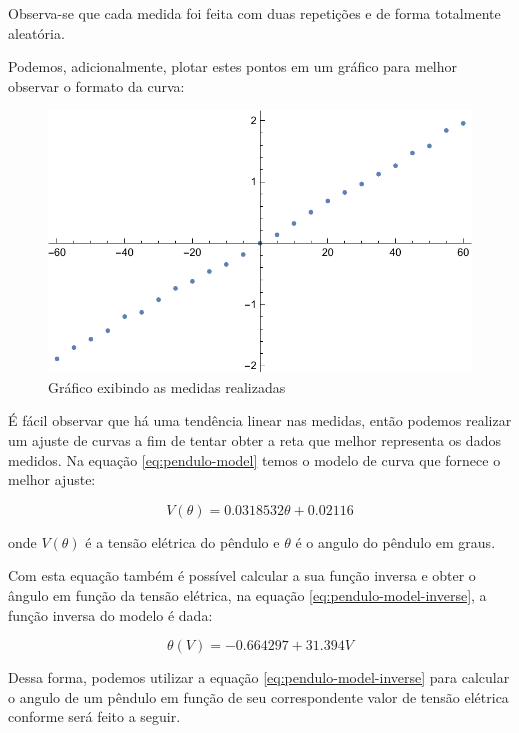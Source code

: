 \documentclass[12pt,a4paper]{instrumentacao}
\begin{document}
Observa-se que cada medida foi feita com duas repetições e de forma totalmente aleatória.

Podemos, adicionalmente, plotar estes pontos em um gráfico para melhor observar o formato da curva:

\begin{figure}[H]
\includegraphics[width=\textwidth]{Pendulo-Pontos.pdf}
\caption{Gráfico exibindo as medidas realizadas}
\label{fig:pendulo-medidas}
\end{figure}

É fácil observar que há uma tendência linear nas medidas, então podemos realizar um ajuste de curvas a fim de tentar obter a reta que melhor representa os dados medidos. Na equação \ref{eq:pendulo-model} temos o modelo de curva que fornece o melhor ajuste:

\begin{equation}
	V(\theta) = 0.0318532 \theta +0.02116
	\label{eq:pendulo-model}
\end{equation}

onde $V(\theta)$ é a tensão elétrica do pêndulo e $\theta$ é o angulo do pêndulo em graus.

Com esta equação também é possível calcular a sua função inversa e obter o ângulo em função da tensão elétrica, na equação \ref{eq:pendulo-model-inverse}, a função inversa do modelo é dada:

\begin{equation}
	\theta(V) = -0.664297 + 31.394 V
	\label{eq:pendulo-model-inverse}
\end{equation}

Dessa forma, podemos utilizar a equação \ref{eq:pendulo-model-inverse} para calcular o angulo de um pêndulo em função de seu correspondente valor de tensão elétrica conforme será feito a seguir.
\end{document}
